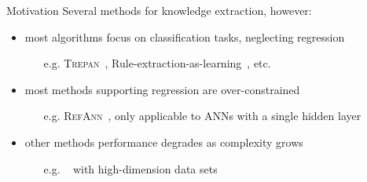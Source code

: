 \documentclass[presentation]{beamer}
\begin{document}
\begin{frame}[c]{Motivation}
	Several methods for knowledge extraction, however:
    \vfill
    \begin{itemize}
        \item most algorithms focus on classification tasks, neglecting regression
        \begin{itemize}
            \item[e.g.] \textsc{Trepan}~, Rule-extraction-as-learning~, etc.
        \end{itemize}
        
        \vfill
        
        \item most methods supporting regression are over-constrained
        \begin{itemize}
            \item[e.g.] \textsc{RefAnn}~, only applicable to ANNs with a single hidden layer
        \end{itemize}
        
        \vfill
        
        \item other methods performance degrades as complexity grows
        \begin{itemize}
			\item[e.g.] \iter~ with high-dimension data sets
		\end{itemize}
        
    \end{itemize}
\end{frame}
\end{document}
